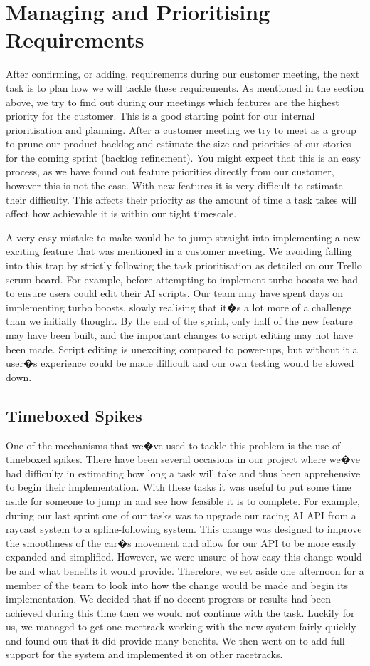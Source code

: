 \section{Managing and Prioritising Requirements}
After confirming, or adding, requirements during our customer meeting, the next task is to plan how we will tackle these requirements. As mentioned in the section above, we try to find out during our meetings which features are the highest priority for the customer. This is a good starting point for our internal prioritisation and planning. After a customer meeting we try to meet as a group to prune our product backlog and estimate the size and priorities of our stories for the coming sprint (backlog refinement). You might expect that this is an easy process, as we have found out feature priorities directly from our customer, however this is not the case. With new features it is very difficult to estimate their difficulty. This affects their priority as the amount of time a task takes will affect how achievable it is within our tight timescale. 

A very easy mistake to make would be to jump straight into implementing a new exciting feature that was mentioned in a customer meeting. We avoiding falling into this trap by strictly following the task prioritisation as detailed on our Trello scrum board. For example, before attempting to implement turbo boosts we had to ensure users could edit their AI scripts. Our team may have spent days on implementing turbo boosts, slowly realising that it�s a lot more of a challenge than we initially thought. By the end of the sprint, only half of the new feature may have been built, and the important changes to script editing may not have been made. Script editing is unexciting compared to power-ups, but without it a user�s experience could be made difficult and our own testing would be slowed down.
\subsection{Timeboxed Spikes}
One of the mechanisms that we�ve used to tackle this problem is the use of timeboxed spikes. There have been several occasions in our project where we�ve had difficulty in estimating how long a task will take and thus been apprehensive to begin their implementation. With these tasks it was useful to put some time aside for someone to jump in and see how feasible it is to complete. For example, during our last sprint one of our tasks was to upgrade our racing AI API from a raycast system to a spline-following system. This change was designed to improve the smoothness of the car�s movement and allow for our API to be more easily expanded and simplified. However, we were unsure of how easy this change would be and what benefits it would provide. Therefore, we set aside one afternoon for a member of the team to look into how the change would be made and begin its implementation. We decided that if no decent progress or results had been achieved during this time then we would not continue with the task. Luckily for us, we managed to get one racetrack working with the new system fairly quickly and found out that it did provide many benefits. We then went on to add full support for the system and implemented it on other racetracks.

